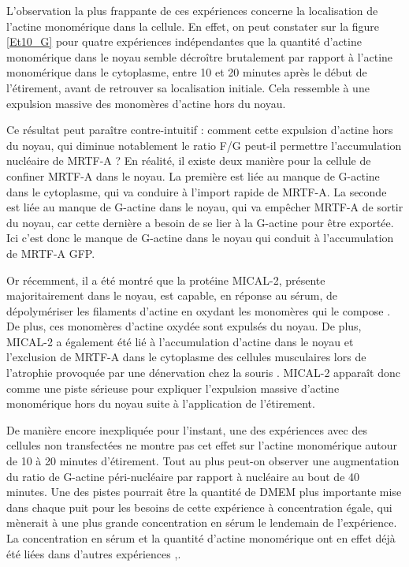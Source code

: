 \documentclass{report}
\begin{document}
L'observation la plus frappante de ces expériences concerne la localisation de l'actine monomérique dans la cellule. En effet, on peut constater sur la figure \ref{Et10_G} pour quatre expériences indépendantes que la quantité d'actine monomérique dans le noyau semble décroître brutalement par rapport à l'actine monomérique dans le cytoplasme, entre 10 et 20 minutes après le début de l'étirement, avant de retrouver sa localisation initiale. Cela ressemble à une expulsion massive des monomères d'actine hors du noyau. 

Ce résultat peut paraître contre-intuitif : comment cette expulsion d'actine hors du noyau, qui diminue notablement le ratio F/G peut-il permettre l'accumulation nucléaire de MRTF-A ? En réalité, il existe deux manière pour la cellule de confiner MRTF-A dans le noyau. La première est liée au manque de G-actine dans le cytoplasme, qui va conduire à l'import rapide de MRTF-A. La seconde est liée au manque de G-actine dans le noyau, qui va empêcher MRTF-A de sortir du noyau, car cette dernière a besoin de se lier à la G-actine pour être exportée. Ici c'est donc le manque de G-actine dans le noyau qui conduit à l'accumulation de MRTF-A GFP. 

Or récemment, il a été montré que la protéine MICAL-2, présente majoritairement dans le noyau, est capable, en réponse au sérum, de dépolymériser les filaments d'actine en oxydant les monomères qui le compose \cite{lundquist}. De plus, ces monomères d'actine oxydée sont expulsés du noyau. De plus, MICAL-2 a également été lié à l'accumulation d'actine dans le noyau et l'exclusion de MRTF-A dans le cytoplasme des cellules musculaires lors de l'atrophie provoquée par une dénervation chez la souris \cite{collard}. MICAL-2 apparaît donc comme une piste sérieuse pour expliquer l'expulsion massive d'actine monomérique hors du noyau suite à l'application de l'étirement. 

De manière encore inexpliquée pour l'instant, une des expériences avec des cellules non transfectées ne montre pas cet effet sur l'actine monomérique autour de 10 à 20 minutes d'étirement. Tout au plus peut-on observer une augmentation du ratio de G-actine péri-nucléaire par rapport à nucléaire au bout de 40 minutes. Une des pistes pourrait être la quantité de DMEM plus importante mise dans chaque puit pour les besoins de cette expérience à concentration égale, qui mènerait à une plus grande concentration en sérum le lendemain de l'expérience. La concentration en sérum et la quantité d'actine monomérique ont en effet déjà été liées dans d'autres expériences \cite{Mouilleron},\cite{Vartiainen}\cite{lundquist}.  
\end{document}
